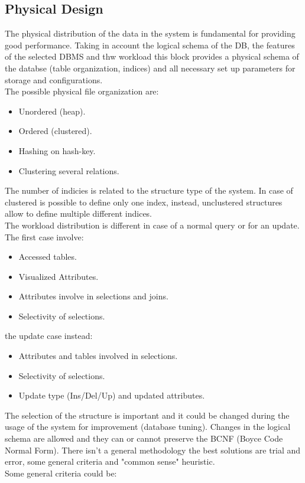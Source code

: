 \documentclass[12pt]{article}
\begin{document}
\subsection{Physical Design}
The physical distribution of the data in the system is fundamental for providing good performance. Taking in account the logical schema of the DB, the features of the selected DBMS and thw workload this block provides a physical schema of the databse (table organization, indices) and all necessary set up parameters for storage and configurations.\\
The possible physical file organization are:
\begin{itemize}
  \item Unordered (heap).
  \item Ordered (clustered).
  \item Hashing on hash-key.
  \item Clustering several relations.
\end{itemize}
The number of indicies is related to the structure type of the system. In case of clustered is possible to define only one index, instead, unclustered structures allow to define multiple different indices.\\
The workload distribution is different in case of a normal query or for an update. The first case involve:
\begin{itemize}
  \item Accessed tables.
  \item Visualized Attributes.
  \item Attributes involve in selections and joins.
  \item Selectivity of selections.
\end{itemize}
the update case instead:
\begin{itemize}
  \item Attributes and tables involved in selections.
  \item Selectivity of selections.
  \item Update type (Ins/Del/Up) and updated attributes.
\end{itemize}
The selection of the structure is important and it could be changed during the usage of the system for improvement (database tuning). Changes in the logical schema are allowed and they can or cannot preserve the BCNF (Boyce Code Normal Form). There isn't a general methodology the best solutions are trial and error, some general criteria and "common sense" heuristic.\\
Some general criteria could be:
\end{document}
